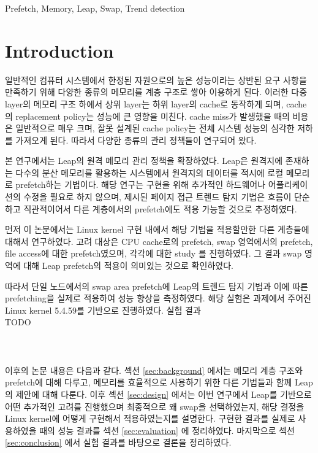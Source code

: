 \documentclass[conference,11pt]{IEEEtran}
\begin{document}
\begin{CJK}{UTF8}{}
    \begin{IEEEkeywords}
        Prefetch, Memory, Leap, Swap, Trend detection
    \end{IEEEkeywords}

    \section{Introduction}

    일반적인 컴퓨터 시스템에서 한정된 자원으로의 높은 성능이라는 상반된 요구 사항을 만족하기 위해 다양한 종류의 메모리를 계층 구조로 쌓아 이용하게 된다. 이러한 다중 layer의 메모리 구조 하에서 상위 layer는 하위 layer의 cache로 동작하게 되며, cache의 replacement policy는 성능에 큰 영향을 미친다. cache miss가 발생했을 때의 비용은 일반적으로 매우 크며, 잘못 설계된 cache policy는 전체 시스템 성능의 심각한 저하를 가져오게 된다. 따라서 다양한 종류의 관리 정책들이 연구되어 왔다.

    본 연구에서는 Leap\cite{leap}의 원격 메모리 관리 정책을 확장하였다. Leap은 원격지에 존재하는 다수의 분산 메모리를 활용하는 시스템에서 원격지의 데이터를 적시에 로컬 메모리로 prefetch하는 기법이다. 해당 연구는 구현을 위해 추가적인 하드웨어나 어플리케이션의 수정을 필요로 하지 않으며, 제시된 페이지 접근 트렌드 탐지 기법은 흐름이 단순하고 직관적이어서 다른 계층에서의 prefetch에도 적용 가능할 것으로 추정하였다.

    먼저 이 논문에서는 Linux kernel 구현 내에서 해당 기법을 적용할만한 다른 계층들에 대해서 연구하였다. 고려 대상은 CPU cache로의 prefetch, swap 영역에서의 prefetch, file access에 대한 prefetch였으며, 각각에 대한 study 를 진행하였다. 그 결과 swap 영역에 대해 Leap prefetch의 적용이 의미있는 것으로 확인하였다.

    따라서 단일 노드에서의 swap area prefetch에 Leap의 트렌드 탐지 기법과 이에 따른 prefetching을 실제로 적용하여 성능 향상을 측정하였다. 해당 실험은 과제에서 주어진 Linux kernel 5.4.59를 기반으로 진행하였다. 실험 결과 \\
    TODO \\
    \\
    \\
    \\

    이후의 논문 내용은 다음과 같다. 섹션 \ref{sec:background} 에서는 메모리 계층 구조와 prefetch에 대해 다루고, 메모리를 효율적으로 사용하기 위한 다른 기법들과 함께 Leap의 제안에 대해 다룬다. 이후 섹션 \ref{sec:design} 에서는 이번 연구에서 Leap를 기반으로 어떤 추가적인 고려를 진행했으며 최종적으로 왜 swap을 선택하였는지, 해당 결정을 Linux kernel에 어떻게 구현해서 적용하였는지를 설명한다. 구현한 결과를 실제로 사용하였을 때의 성능 결과를 섹션 \ref{sec:evaluation} 에 정리하였다. 마지막으로 섹션 \ref{sec:conclusion} 에서 실험 결과를 바탕으로 결론을 정리하였다.


\end{CJK}
\end{document}
